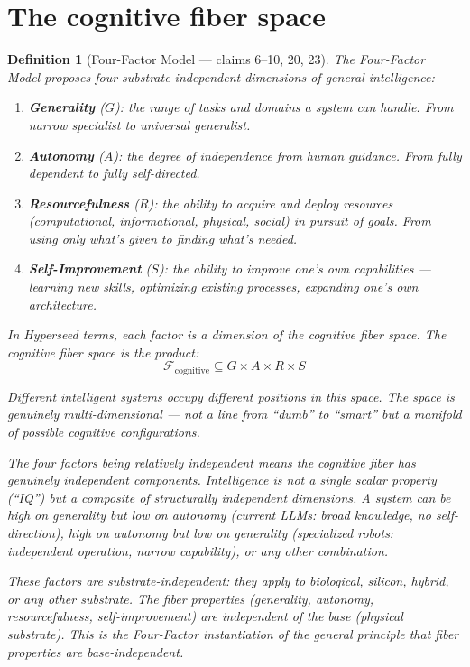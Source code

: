 \documentclass[11pt,a4paper]{article}
\newtheorem{definition}{Definition}[section]
\begin{document}
\section{The cognitive fiber space}
\label{sec:fiber-space}

\begin{definition}[Four-Factor Model --- claims 6--10, 20, 23]
\label{def:factors}
The Four-Factor Model proposes four substrate-independent dimensions
of general intelligence:
\begin{enumerate}
\item \textbf{Generality} ($G$): the range of tasks and domains a
  system can handle. From narrow specialist to universal generalist.
\item \textbf{Autonomy} ($A$): the degree of independence from human
  guidance. From fully dependent to fully self-directed.
\item \textbf{Resourcefulness} ($R$): the ability to acquire and deploy
  resources (computational, informational, physical, social) in pursuit
  of goals. From using only what's given to finding what's needed.
\item \textbf{Self-Improvement} ($S$): the ability to improve one's own
  capabilities --- learning new skills, optimizing existing processes,
  expanding one's own architecture.
\end{enumerate}

In Hyperseed terms, each factor is a \emph{dimension of the cognitive
fiber space}. The cognitive fiber space is the product:
\[
  \mathcal{F}_{\text{cognitive}} \subseteq G \times A \times R \times S
\]

Different intelligent systems occupy different positions in this space.
The space is genuinely multi-dimensional --- not a line from ``dumb''
to ``smart'' but a manifold of possible cognitive configurations.

The four factors being \emph{relatively independent} means the
cognitive fiber has genuinely independent components. Intelligence is
not a single scalar property (``IQ'') but a composite of structurally
independent dimensions. A system can be high on generality but low on
autonomy (current LLMs: broad knowledge, no self-direction), high on
autonomy but low on generality (specialized robots: independent
operation, narrow capability), or any other combination.

These factors are substrate-independent: they apply to biological,
silicon, hybrid, or any other substrate. The fiber properties
(generality, autonomy, resourcefulness, self-improvement) are
independent of the base (physical substrate). This is the Four-Factor
instantiation of the general principle that fiber properties are
base-independent.
\end{definition}
\end{document}
